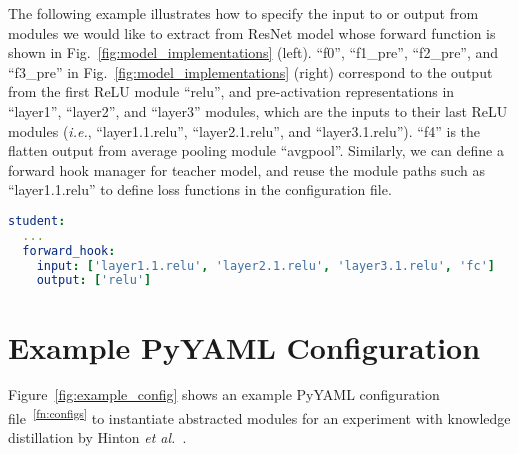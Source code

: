 \documentclass[runningheads]{llncs}
\begin{document}
The following example illustrates how to specify the input to or output from modules we would like to extract from ResNet model whose forward function is shown in Fig.~\ref{fig:model_implementations} (left).
``f0'', ``f1\_pre'', ``f2\_pre'', and ``f3\_pre'' in Fig.~\ref{fig:model_implementations} (right) correspond to the output from the first ReLU module ``relu'', and pre-activation representations in ``layer1'', ``layer2'', and ``layer3'' modules, which are the inputs to their last ReLU modules (\emph{i.e.}, ``layer1.1.relu'', ``layer2.1.relu'', and ``layer3.1.relu'').
``f4'' is the flatten output from average pooling module ``avgpool''.
Similarly, we can define a forward hook manager for teacher model, and reuse the module paths such as ``layer1.1.relu'' to define loss functions in the configuration file.

\begin{lstlisting}[language=yaml, backgroundcolor=\color{MintCream}, basicstyle=\scriptsize]
student:
  ...
  forward_hook:
    input: ['layer1.1.relu', 'layer2.1.relu', 'layer3.1.relu', 'fc']
    output: ['relu']
\end{lstlisting}

\section{Example PyYAML Configuration}
\label{appendix:example_config}

Figure~\ref{fig:example_config} shows an example PyYAML configuration file~\textsuperscript{\ref{fn:configs}} to instantiate abstracted modules for an experiment with knowledge distillation by Hinton \emph{et al.}~\cite{hinton14distilling}.
\end{document}
